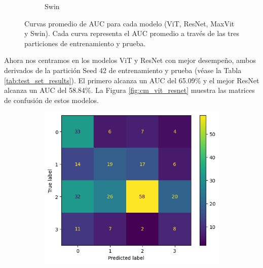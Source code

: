 \documentclass[a4paper,10pt]{book}
\begin{document}
\begin{figure}[h!]
\begin{subfigure}[t]{0.48\textwidth}
        \caption{Swin}
        \label{fig:mean_auc_swin}
    \end{subfigure}
    \caption[Curvas promedio de AUC]{Curvas promedio de AUC para cada modelo (ViT, ResNet, MaxVit y Swin). Cada curva representa el AUC promedio a través de las tres particiones de entrenamiento y prueba.}
    \label{fig:mean_auc_images}
\end{figure}

Ahora nos centramos en los modelos ViT y ResNet con mejor desempeño, ambos derivados de la partición Seed 42 de entrenamiento y prueba (véase la Tabla \ref{tab:test_set_results}). El primero alcanza un AUC del 65.09\% y el mejor ResNet alcanza un AUC del 58.84\%. La Figura \ref{fig:cm_vit_resnet} muestra las matrices de confusión de estos modelos.

\begin{figure}[h!]
    \centering
    \begin{subfigure}[t]{0.48\textwidth}
        \centering
        \includegraphics[width=\textwidth]{reports/assets/CM-42-ViT.png}
        \caption{}
        \label{fig:cm_vit}
    \end{subfigure}
    \begin{subfigure}[t]{0.48\textwidth}
        \centering

\end{subfigure}
\end{figure}
\end{document}
